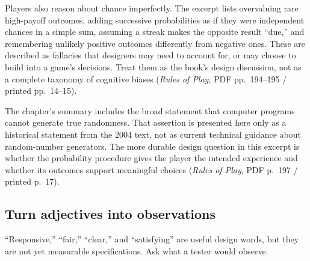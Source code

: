 Players also reason about chance imperfectly. The excerpt lists overvaluing rare high-payoff outcomes, adding successive probabilities as if they were independent chances in a simple sum, assuming a streak makes the opposite result ``due,'' and remembering unlikely positive outcomes differently from negative ones. These are described as fallacies that designers may need to account for, or may choose to build into a game's decisions. Treat them as the book's design discussion, not as a complete taxonomy of cognitive biases (\emph{Rules of Play}, PDF pp.~194--195 / printed pp.~14--15).

The chapter's summary includes the broad statement that computer programs cannot generate true randomness. That assertion is presented here only as a historical statement from the 2004 text, not as current technical guidance about random-number generators. The more durable design question in this excerpt is whether the probability procedure gives the player the intended experience and whether its outcomes support meaningful choices (\emph{Rules of Play}, PDF p.~197 / printed p.~17).

\subsection{Turn adjectives into observations}\label{05-engine-i-ch009-turn-adjectives-into-observations}

``Responsive,'' ``fair,'' ``clear,'' and ``satisfying'' are useful design words, but they are not yet measurable specifications. Ask what a tester would observe.

